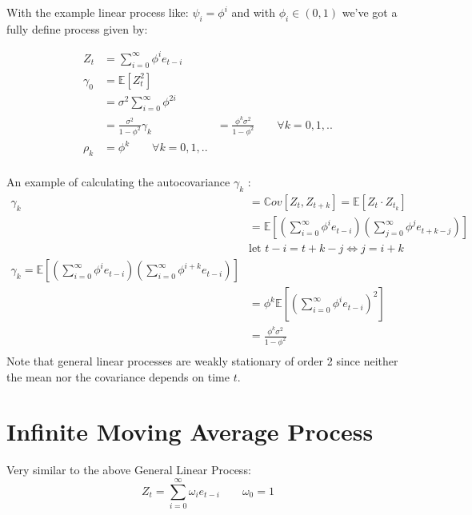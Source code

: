 With the example linear process like: $\psi_i = \phi^i$ and with $\phi_i \in
(0, 1)$ we've got a fully define process given by:

\begin{equation*}
    \begin{aligned}
        Z_t &= \sum_{i=0}^{\infty} \phi^i e_{t-i} \\
        \gamma_0 &= \mathbb{E}[Z_t^2]\\
                 &= \sigma^2 \sum_{i=0}^{\infty} \phi^{2i}\\
                 &= \frac{\sigma^2}{1 - \phi^2}
        \gamma_k &= \frac{\phi^k \sigma^2}{1 - \phi^2} \qquad \forall k=0,1,.. \\
        \rho_k &= \phi^k \qquad \forall k=0,1,.. \\
    \end{aligned}
\end{equation*}

An example of calculating the autocovariance $\gamma_k$ :
\begin{equation*}
    \begin{aligned}
        \gamma_k &= \mathbb{C}ov[Z_t, Z_{t+k}] = \mathbb{E}[Z_t \cdot Z_{t_k}] \\
                 &= \mathbb{E}[\left( \sum_{i=0}^{\infty} \phi^i e_{t-i}\right)
                 \left(\sum_{j=0}^{\infty} \phi^j e_{t+k-j} \right)] \\
                 &\text{let } t - i = t + k - j \iff j = i+k\\
        \gamma_k = \mathbb{E}[\left( \sum_{i=0}^{\infty} \phi^i e_{t-i}\right)
                \left(\sum_{i=0}^{\infty} \phi^{i+k} e_{t-i} \right)] \\
            &= \phi^k \mathbb{E}[\left( \sum_{i=0}^{\infty} \phi^i
                 e_{t-i}\right)^2] \\
            &= \frac{\phi^k \sigma^2}{1 - \phi^2} \\
    \end{aligned}
\end{equation*}
Note that general linear processes are weakly stationary of order 2 since
neither the mean nor the covariance depends on time $t$.


\section{Infinite Moving Average Process}
Very similar to the above General Linear Process:
\begin{equation*}
    Z_t = \sum_{i=0}^{\infty} \omega_i e_{t-i} \qquad \omega_0 = 1
\end{equation*}


